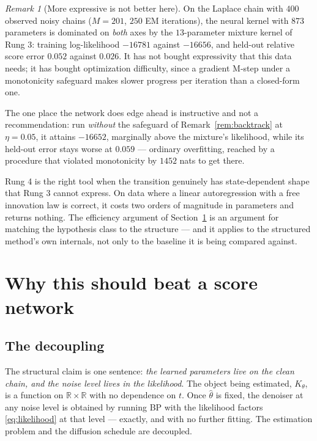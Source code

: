\documentclass[11pt]{article}
\theoremstyle{remark}
\newtheorem{remark}{Remark}
\newcommand{\R}{\mathbb{R}}
\begin{document}
\begin{remark}[More expressive is not better here]
\label{rem:rung4-loses}
On the Laplace chain with $400$ observed noisy chains ($M = 201$, $250$ EM
iterations), the neural kernel with $873$ parameters is dominated on
\emph{both} axes by the $13$-parameter mixture kernel of Rung 3: training
log-likelihood $-16781$ against $-16656$, and held-out relative score error
$0.052$ against $0.026$. It has not bought expressivity that this data needs; it
has bought optimization difficulty, since a gradient M-step under a monotonicity
safeguard makes slower progress per iteration than a closed-form one.

The one place the network does edge ahead is instructive and not a
recommendation: run \emph{without} the safeguard of
Remark~\ref{rem:backtrack} at $\eta = 0.05$, it attains $-16652$, marginally
above the mixture's likelihood, while its held-out error stays worse at
$0.059$ --- ordinary overfitting, reached by a procedure that violated
monotonicity by $1452$ nats to get there.

Rung 4 is the right tool when the transition genuinely has state-dependent
shape that Rung 3 cannot express. On data where a linear autoregression with a
free innovation law is correct, it costs two orders of magnitude in parameters
and returns nothing. The efficiency argument of Section~\ref{sec:efficiency} is
an argument for matching the hypothesis class to the structure --- and it
applies to the structured method's own internals, not only to the baseline it
is being compared against.
\end{remark}

\section{Why this should beat a score network}
\label{sec:efficiency}

\subsection{The decoupling}

The structural claim is one sentence: \emph{the learned parameters live on the
clean chain, and the noise level lives in the likelihood}. The object being
estimated, $K_\theta$, is a function on $\R \times \R$ with no dependence on $t$.
Once $\hat\theta$ is fixed, the denoiser at any noise level is obtained by
running BP with the likelihood factors \eqref{eq:likelihood} at that level ---
exactly, and with no further fitting. The estimation problem and the diffusion
schedule are decoupled.
\end{document}
